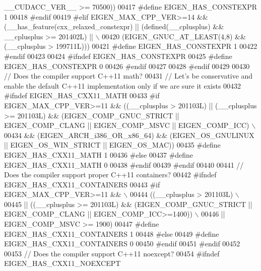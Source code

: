 \begin{DoxyCode}
{       \_\_CUDACC\_VER\_\_ >= 70500))}
00417 \textcolor{preprocessor}{  #define EIGEN\_HAS\_CONSTEXPR 1}
00418 \textcolor{preprocessor}{#endif}
00419 \textcolor{preprocessor}{#elif EIGEN\_MAX\_CPP\_VER>=14 && (\_\_has\_feature(cxx\_relaxed\_constexpr) || (defined(\_\_cplusplus) &&
       \_\_cplusplus >= 201402L) || \(\backslash\)}
00420 \textcolor{preprocessor}{  (EIGEN\_GNUC\_AT\_LEAST(4,8) && (\_\_cplusplus > 199711L)))}
00421 \textcolor{preprocessor}{#define EIGEN\_HAS\_CONSTEXPR 1}
00422 \textcolor{preprocessor}{#endif}
00423 
00424 \textcolor{preprocessor}{#ifndef EIGEN\_HAS\_CONSTEXPR}
00425 \textcolor{preprocessor}{#define EIGEN\_HAS\_CONSTEXPR 0}
00426 \textcolor{preprocessor}{#endif}
00427 
00428 \textcolor{preprocessor}{#endif}
00429 
00430 \textcolor{comment}{// Does the compiler support C++11 math?}
00431 \textcolor{comment}{// Let's be conservative and enable the default C++11 implementation only if we are sure it exists}
00432 \textcolor{preprocessor}{#ifndef EIGEN\_HAS\_CXX11\_MATH}
00433 \textcolor{preprocessor}{  #if EIGEN\_MAX\_CPP\_VER>=11 && ((\_\_cplusplus > 201103L) || (\_\_cplusplus >= 201103L) &&
       (EIGEN\_COMP\_GNUC\_STRICT || EIGEN\_COMP\_CLANG || EIGEN\_COMP\_MSVC || EIGEN\_COMP\_ICC)  \(\backslash\)}
00434 \textcolor{preprocessor}{      && (EIGEN\_ARCH\_i386\_OR\_x86\_64) && (EIGEN\_OS\_GNULINUX || EIGEN\_OS\_WIN\_STRICT || EIGEN\_OS\_MAC))}
00435 \textcolor{preprocessor}{    #define EIGEN\_HAS\_CXX11\_MATH 1}
00436 \textcolor{preprocessor}{  #else}
00437 \textcolor{preprocessor}{    #define EIGEN\_HAS\_CXX11\_MATH 0}
00438 \textcolor{preprocessor}{  #endif}
00439 \textcolor{preprocessor}{#endif}
00440 
00441 \textcolor{comment}{// Does the compiler support proper C++11 containers?}
00442 \textcolor{preprocessor}{#ifndef EIGEN\_HAS\_CXX11\_CONTAINERS}
00443 \textcolor{preprocessor}{  #if    EIGEN\_MAX\_CPP\_VER>=11 && \(\backslash\)}
00444 \textcolor{preprocessor}{         ((\_\_cplusplus > 201103L) \(\backslash\)}
00445 \textcolor{preprocessor}{      || ((\_\_cplusplus >= 201103L) && (EIGEN\_COMP\_GNUC\_STRICT || EIGEN\_COMP\_CLANG || EIGEN\_COMP\_ICC>=1400))
       \(\backslash\)}
00446 \textcolor{preprocessor}{      || EIGEN\_COMP\_MSVC >= 1900)}
00447 \textcolor{preprocessor}{    #define EIGEN\_HAS\_CXX11\_CONTAINERS 1}
00448 \textcolor{preprocessor}{  #else}
00449 \textcolor{preprocessor}{    #define EIGEN\_HAS\_CXX11\_CONTAINERS 0}
00450 \textcolor{preprocessor}{  #endif}
00451 \textcolor{preprocessor}{#endif}
00452 
00453 \textcolor{comment}{// Does the compiler support C++11 noexcept?}
00454 \textcolor{preprocessor}{#ifndef EIGEN\_HAS\_CXX11\_NOEXCEPT}

\end{DoxyCode}
